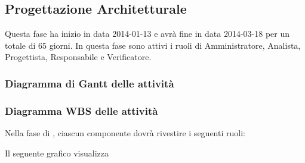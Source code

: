 \subsection{Progettazione Architetturale}
Questa fase ha inizio in data 2014-01-13 e avrà fine in data 2014-03-18 per un totale di 65 giorni. In questa fase sono attivi i ruoli di Amministratore, Analista, Progettista, Responsabile e Verificatore.

\subsubsection{Diagramma di Gantt delle attività}

\subsubsection{Diagramma WBS delle attività}




Nella fase di , ciascun componente dovrà rivestire i seguenti ruoli:

Il seguente grafico visualizza 
